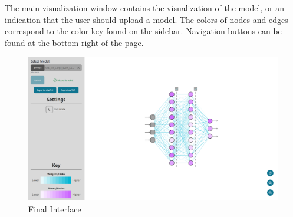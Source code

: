 The main visualization window contains the visualization of the model, or an indication that the user should upload a model. The colors of nodes and edges correspond to the color key found on the sidebar. Navigation buttons can be found at the bottom right of the page.

\begin{figure}[ht]
    \centering
    \includegraphics[width=1\textwidth]{03_design/res/final_interface.png}
    \caption{Final Interface}
    \label{fig:ui_final}
\end{figure}